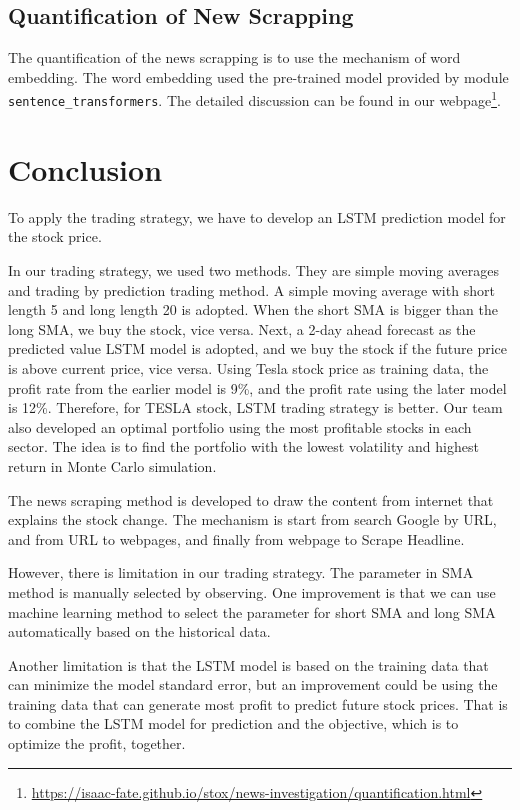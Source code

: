 \documentclass[a4paper, 11pt]{my-elegantpaper}
\begin{document}
\subsection{Quantification of New Scrapping}

The quantification of the news scrapping is to use the mechanism of word embedding. The word embedding used the pre-trained model provided by module \verb|sentence_transformers|. The detailed discussion can be found in our webpage\footnote{\url{https://isaac-fate.github.io/stox/news-investigation/quantification.html}}.


\section{Conclusion}

To apply the trading strategy, we have to develop an LSTM prediction model for the stock price.

In our trading strategy, we used two methods. They are simple moving averages and trading by prediction trading method. A simple moving average with short length 5 and long length 20 is adopted. When the short SMA is bigger than the long SMA, we buy the stock, vice versa. Next, a 2-day ahead forecast as the predicted value LSTM model is adopted, and we buy the stock if the future price is above current price, vice versa. Using Tesla stock price as training data, the profit rate from the earlier model is 9\%, and the profit rate using the later model is 12\%. Therefore, for TESLA stock, LSTM trading strategy is better. Our team also developed an optimal portfolio using the most profitable stocks in each sector. The idea is to find the portfolio with the lowest volatility and highest return in Monte Carlo simulation.

The news scraping method is developed to draw the content from internet that explains the stock change. The mechanism is start from search Google by URL, and from URL to webpages, and finally from webpage to Scrape Headline. 

However, there is limitation in our trading strategy. The parameter in SMA method is manually selected by observing. One improvement is that we can use machine learning method to select the parameter for short SMA and long SMA automatically based on the historical data.

Another limitation is that the LSTM model is based on the training data that can minimize the model standard error, but an improvement could be using the training data that can generate most profit to predict future stock prices. That is to combine the LSTM model for prediction and the objective, which is to optimize the profit, together. 
\end{document}
